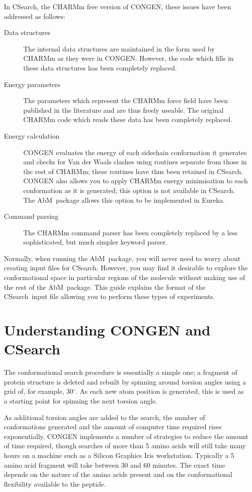 \documentclass{report}
\newcommand{\cs}{CSearch}
\newcommand{\abm}{AbM}
\newcommand{\degree}{\mbox{${}^{\circ}$}}
\begin{document}
In \cs, the CHARMm free version of CONGEN, these issues have been addressed
as follows:
\begin{description}
\item[Data structures] The internal data structures are maintained in
the form used by CHARMm as they were in CONGEN. However, the code which 
fills in these data structures has been completely replaced.
\item[Energy parameters] The parameters which represent the CHARMm force
field have been published in the literature and are thus freely useable.
The original CHARMm code which reads these data has been completely replaced.
\item[Energy calculation] CONGEN evaluates the energy of each sidechain
conformation it generates and checks for Van der Waals clashes using 
routines separate from those in the rest of
CHARMm; these routines have thus been retained in \cs. 
CONGEN also allows
you to apply CHARMm energy minimisation to each conformation as it is 
generated; this option is not available in \cs. The \abm\ package allows
this option to be implemented in Eureka.
\item[Command parsing] The CHARMm command parser has been completely
replaced by a less sophisticated, but much simpler keyword parser.
\end{description}

Normally, when running the \abm\ package, you will never need to worry
about creating input files for \cs. However, you may find it desirable to
explore the conformational space in particular regions of the molecule
without making use of the rest of the \abm\ package. This guide explains the
format of the \cs\ input file allowing you to perform these types of
experiments.

\section{Understanding CONGEN and \cs}
\label{sec:understanding}
The conformational search procedure is essentially a simple one; a fragment
of protein structure is deleted and rebuilt by spinning around torsion
angles using a grid of, for example, 30\degree. As each new atom
position is generated, this is used as a starting point for spinning the
next torsion angle.

As additional torsion angles are added to the search, the number of 
conformations
generated and the amount of computer time required rises exponentially.
CONGEN implements a number of strategies to reduce the amount of time
required, though searches of more than 5 amino acids will still take
many hours on a machine such as a Silicon Graphics Iris workstation.
Typically a 5 amino acid fragment will take between 30 and 60 minutes. The
exact time depends on the nature of the amino acids present and on the
conformational flexibility available to the peptide.
\end{document}
